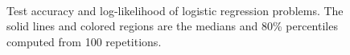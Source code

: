 \begin{figure}
{  } \\
  \caption{Test accuracy and log-likelihood of logistic regression problems.
    The solid lines and colored regions are the medians and 80\% percentiles computed from 100 repetitions.
  }\label{fig:logistic}
  \vspace{-0.2in}
\end{figure}

\vspace{-0.1in}

